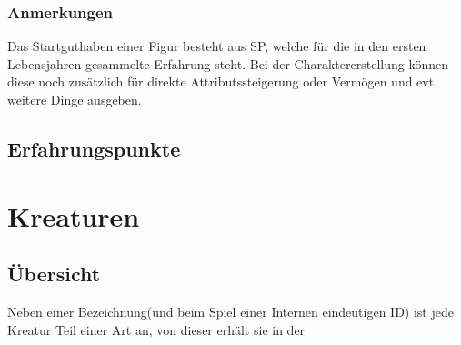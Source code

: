 \documentclass[a4paper,12pt,oneside]{book}
\begin{document}
\section{Anmerkungen}
Das Startguthaben einer Figur besteht aus SP, welche für die in den ersten Lebensjahren gesammelte Erfahrung steht. Bei der Charaktererstellung können diese noch zusätzlich für direkte Attributssteigerung oder Vermögen und evt. weitere Dinge ausgeben.

\chapter{Erfahrungspunkte}


\part{Kreaturen}
\setcounter{chapter}{0}
\chapter{Übersicht}
Neben einer Bezeichnung(und beim Spiel einer Internen eindeutigen ID) ist jede Kreatur Teil einer Art an, von dieser erhält sie in der 
\end{document}
